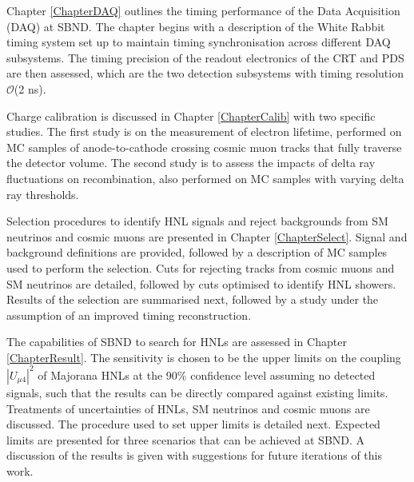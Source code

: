 Chapter \ref{ChapterDAQ} outlines the timing performance of the Data Acquisition (DAQ) at SBND.
The chapter begins with a description of the White Rabbit timing system set up to maintain timing synchronisation across different DAQ subsystems.
The timing precision of the readout electronics of the CRT and PDS are then assessed, which are the two detection subsystems with timing resolution $\mathcal{O}$(2 ns).

Charge calibration is discussed in Chapter \ref{ChapterCalib} with two specific studies.
The first study is on the measurement of electron lifetime, performed on MC samples of anode-to-cathode crossing cosmic muon tracks that fully traverse the detector volume.
The second study is to assess the impacts of delta ray fluctuations on recombination, also performed on MC samples with varying delta ray thresholds.  
                                                                                                                                            
Selection procedures to identify HNL signals and reject backgrounds from SM neutrinos and cosmic muons are presented in Chapter \ref{ChapterSelect}.
Signal and background definitions are provided, followed by a description of MC samples used to perform the selection.
Cuts for rejecting tracks from cosmic muons and SM neutrinos are detailed, followed by cuts optimised to identify HNL showers.
Results of the selection are summarised next, followed by a study under the assumption of an improved timing reconstruction.
                                                                                                                                                     
The capabilities of SBND to search for HNLs are assessed in Chapter \ref{ChapterResult}.
The sensitivity is chosen to be the upper limits on the coupling $|U_{\mu4}|^2$ of Majorana HNLs at the 90\% confidence level assuming no detected signals, such that the results can be directly compared against existing limits.
Treatments of uncertainties of HNLs, SM neutrinos and cosmic muons are discussed.
The procedure used to set upper limits is detailed next.
Expected limits are presented for three scenarios that can be achieved at SBND.
A discussion of the results is given with suggestions for future iterations of this work.                        


